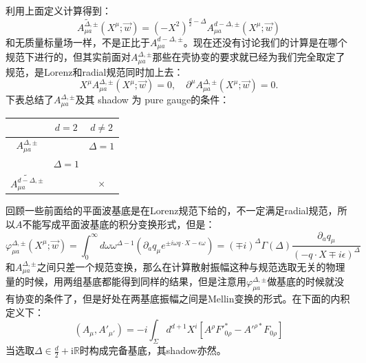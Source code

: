 利用上面定义计算得到：
\begin{equation}
	\boxed{
	\widetilde{A_{\mu a}^{\Delta,\pm}}(X^\mu;\vec{w})=(-X^2)^{\frac{d}{2}-\Delta}A_{\mu a}^{d-\Delta,\pm}(X^\mu;\vec{w})
	}
\end{equation}
和无质量标量场一样，不是正比于$A_{\mu a}^{d-\Delta,\pm}$。现在还没有讨论我们的计算是在哪个规范下进行的，但其实前面对$A_{\mu a}^{\Delta,\pm}$那些在壳协变的要求就已经为我们完全取定了规范，是Lorenz和radial规范同时加上去：
\begin{equation}
	X^{\mu}A_{\mu a}^{\Delta,\pm}(X^{\mu};\vec{w})=0,\quad\partial^{\mu}A_{\mu a}^{\Delta,\pm}(X^{\mu};\vec{w})=0.
\end{equation}
下表总结了$A_{\mu a}^{\Delta,\pm}$及其 shadow 为 pure gauge的条件：
\begin{center}
	\begin{tabular}[H]{|c|c|c|}
		\hline & $d=2$ & $d \neq 2$ \\
		\hline$A_{\mu a}^{\Delta, \pm}$ & & $\Delta=1$ \\
		& $\Delta=1$ & \\
		$\widetilde{A_{\mu a}^{d-\Delta, \pm}}$& & $\times$ \\
		\hline
	\end{tabular}
\end{center}
回顾一些前面给的平面波基底是在Lorenz规范下给的，不一定满足radial规范，所以$A$不能写成平面波基底的积分变换形式，但是：
\begin{equation}
	\boxed{
	\varphi_{\mu a}^{\Delta,\pm}(X^{\mu};\vec{w})=\int_0^\infty d\omega\omega^{\Delta-1}\left(\partial_aq_\mu e^{\pm i\omega q\cdot X-\epsilon\omega}\right)=(\mp i)^\Delta\Gamma(\Delta)\frac{\partial_aq_\mu}{(-q\cdot X\mp i\epsilon)^\Delta}
	}
\end{equation}
和$A_{\mu a}^{\Delta,\pm}$之间只差一个规范变换，那么在计算散射振幅这种与规范选取无关的物理量的时候，用两组基底都能得到同样的结果，但是注意用$\varphi_{\mu a}^{\Delta,\pm}$做基底的时候就没有协变的条件了，但是好处在两基底振幅之间是Mellin变换的形式。在下面的内积定义下：
\begin{equation}
	(A_{\mu},A'_{\mu'})=-i\int _\Sigma d^{d+1}X^i\left[A^{\rho}F'^*_{0\rho}-A'^{\rho*}F_{0\rho}\right]
\end{equation}
当选取$\boxed{\Delta\in\frac{d}{2}+\mathrm{i}\mathbb{R}}$时构成完备基底，其shadow亦然。

